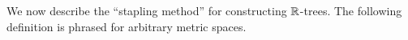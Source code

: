 %
%
%
%
%
%
%
%

We now describe the ``stapling method'' for constructing $\R$-trees. The following definition is phrased for arbitrary metric spaces.

